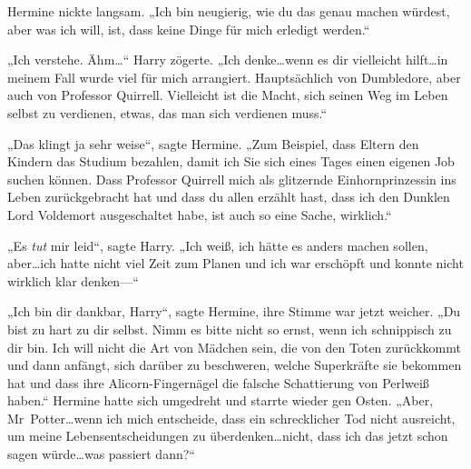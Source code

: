 Hermine nickte langsam. „Ich bin neugierig, wie du das genau machen würdest, aber was ich will, ist, dass keine Dinge für mich erledigt werden.“

„Ich verstehe. Ähm…“ Harry zögerte. „Ich denke…wenn es dir vielleicht hilft…in meinem Fall wurde viel für mich arrangiert. Hauptsächlich von Dumbledore, aber auch von Professor Quirrell. Vielleicht ist die Macht, sich seinen Weg im Leben selbst zu verdienen, etwas, das man sich verdienen muss.“

„Das klingt ja sehr weise“, sagte Hermine. „Zum Beispiel, dass Eltern den Kindern das Studium bezahlen, damit ich Sie sich eines Tages einen eigenen Job suchen können. Dass Professor Quirrell mich als glitzernde Einhornprinzessin ins Leben zurückgebracht hat und dass du allen erzählt hast, dass ich den Dunklen Lord Voldemort ausgeschaltet habe, ist auch so eine Sache, wirklich.“

„Es \emph{tut} mir leid“, sagte Harry. „Ich weiß, ich hätte es anders machen sollen, aber…ich hatte nicht viel Zeit zum Planen und ich war erschöpft und konnte nicht wirklich klar denken—“

„Ich bin dir dankbar, Harry“, sagte Hermine, ihre Stimme war jetzt weicher. „Du bist zu hart zu dir selbst. Nimm es bitte nicht so ernst, wenn ich schnippisch zu dir bin. Ich will nicht die Art von Mädchen sein, die von den Toten zurückkommt und dann anfängt, sich darüber zu beschweren, welche Superkräfte sie bekommen hat und dass ihre Alicorn-Fingernägel die falsche Schattierung von Perlweiß haben.“ Hermine hatte sich umgedreht und starrte wieder gen Osten. „Aber, Mr~Potter…wenn ich mich entscheide, dass ein schrecklicher Tod nicht ausreicht, um meine Lebensentscheidungen zu überdenken…nicht, dass ich das jetzt schon sagen würde…was passiert dann?“

